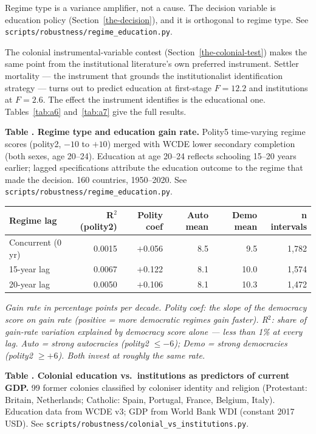 \documentclass[12pt,letterpaper]{article}
\begin{document}
{Regime type is a variance amplifier, not a cause. The decision variable is education policy (Section~\ref{the-decision}), and it is orthogonal to regime type. See \texttt{scripts/robustness/regime\_education.py}.

The colonial instrumental-variable contest (Section~\ref{the-colonial-test}) makes the same point from the institutional literature's own preferred instrument. Settler mortality --- the instrument that grounds the institutionalist identification strategy --- turns out to predict education at first-stage $F = 12.2$ and institutions at $F = 2.6$. The effect the instrument identifies is the educational one. Tables~\ref{tab:a6} and~\ref{tab:a7} give the full results.

\label{tab:a5}\textbf{Table \thetable. Regime type and education gain rate.} Polity5
time-varying regime scores (polity2, $-10$ to $+10$) merged with WCDE
lower secondary completion (both sexes, age 20--24). Education at age
20--24 reflects schooling 15--20 years earlier; lagged specifications
attribute the education outcome to the regime that made the decision.
160 countries, 1950--2020. See
\texttt{scripts/robustness/regime\_education.py}.

{\small
\begin{longtable}[]{@{}lrrrrr@{}}
\toprule
Regime lag & R$^2$(polity2) & Polity coef & Auto mean & Demo mean & n intervals \\
\midrule
\endhead
Concurrent (0 yr) & 0.0015 & $+$0.056 & 8.5 & 9.5 & 1,782 \\
15-year lag & 0.0067 & $+$0.122 & 8.1 & 10.0 & 1,574 \\
20-year lag & 0.0050 & $+$0.106 & 8.1 & 10.3 & 1,472 \\
\bottomrule
\end{longtable}
}

\emph{Gain rate in percentage points per decade. Polity coef: the slope
of the democracy score on gain rate (positive = more democratic
regimes gain faster). R$^2$: share of gain-rate variation explained by
democracy score alone --- less than 1\% at every lag. Auto = strong
autocracies (polity2 $\leq -6$); Demo = strong democracies (polity2
$\geq +6$). Both invest at roughly the same rate.}

\label{tab:a6}\textbf{Table \thetable. Colonial education vs.\ institutions as predictors of
current GDP.} 99 former colonies classified by coloniser identity and
religion (Protestant: Britain, Netherlands; Catholic: Spain, Portugal,
France, Belgium, Italy). Education data from WCDE v3; GDP from World
Bank WDI (constant 2017 USD). See
\texttt{scripts/robustness/colonial\_vs\_institutions.py}.

}
\end{document}
